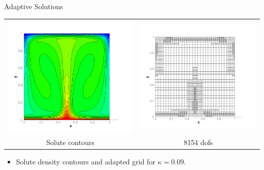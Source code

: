 \documentclass[compress,12pt]{beamer}
\begin{document}
\begin{frame}{Adaptive Solutions}
{\begin{center}
      \begin{tabular}{cc} \\
	\includegraphics[width=.5\textwidth]{figures/s_adapt_kappa_0_09}&
	\includegraphics[width=.5\textwidth]{figures/grid_adapt_kappa_0_09}\\
	Solute contours &
	8154 dofs
      \end{tabular}\end{center}
    \begin{itemize}
      
    \item Solute density contours and adapted grid for $\kappa=0.09$.
    \end{itemize}
  }


\end{frame}
\end{document}
